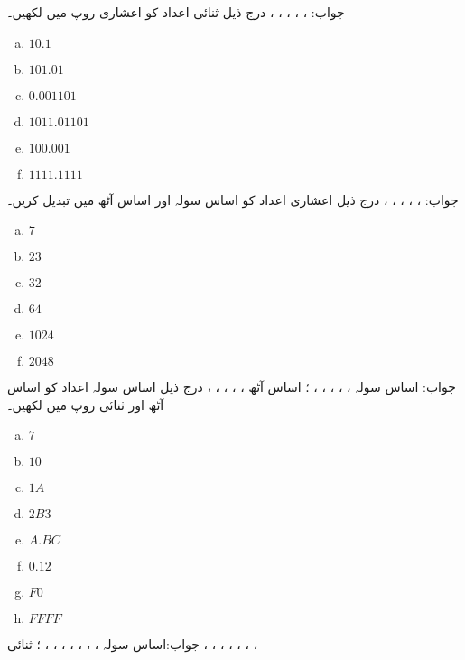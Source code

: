 جواب: ، ، ، ، ، 
درج ذیل ثنائی اعداد کو اعشاری روپ میں لکھیں۔
\begin{multicols}{4}
\begin{enumerate}[a.]

\item  
 
 \(10.1\)  
\item  
 
 \(101.01\)

\item  
 
 \(0.001101\) 
\item  
 
 \(1011.01101\)

\item  
 
 \(100.001\) 
\item  
 
 \(1111.1111\)
\end{enumerate}
\end{multicols}
جواب: ،   ،   ،   ،   ،   
درج ذیل اعشاری اعداد کو اساس سولہ اور اساس آٹھ میں تبدیل کریں۔
\begin{multicols}{4}
\begin{enumerate}[a.]

\item 
 \(7\) 
\item 
 \(23\) 
\item 
 \(32\) 
\item 
 \(64\)  

\item 
 \(1024\) 
\item 
 \(2048\)
\end{enumerate}
\end{multicols}
جواب:  اساس سولہ ، ، ، ، ، ؛ اساس آٹھ   ، ، ، ، ، 
درج ذیل اساس سولہ اعداد کو اساس آٹھ اور ثنائی روپ میں لکھیں۔
\begin{multicols}{4}
\begin{enumerate}[a.]

\item 
 \(7\) 
\item 
 \(10\) 
\item 
 \(1A\) 
\item 
 \(2B3\) 

\item 
 \(A.BC\) 
\item 
 \(0.12\) 
\item 
 \(F0\) 
\item 
 \(FFFF\)
\end{enumerate}
\end{multicols} 
جواب:اساس سولہ   ، ، ، ، ، ، ، ؛ ثنائی  ، ، ، ، ، ، ، 

